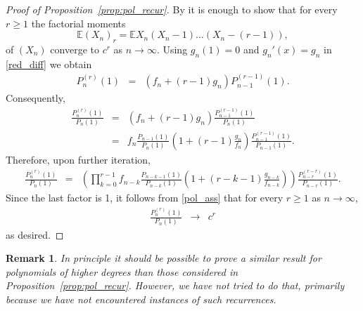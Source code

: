 \documentclass[10pt]{amsart}
\newtheorem{remark}{Remark}
\numberwithin{subcase}{case}
\begin{document}
\begin{proof}[Proof of Proposition~\ref{prop:pol_recur}]
By \cite[Theorem~20, Chapter~1]{B} it is enough to  show that for every $r\ge 1$  the factorial moments 
\[{\mathbb{E}}(X_n)_r={\mathbb{E}} X_n(X_n-1)\dots(X_n-(r-1)),\]
of $(X_n)$ converge to $c^r$ as $n\to\infty$.       
Using $g_n(1)=0$ and $g_n'(x)=g_n$ in \eqref{red_diff} we obtain 
\begin{eqnarray*}
P_n^{(r)}(1)&=&\left(f_n+(r-1)g_n\right)P_{n-1}^{(r-1)}(1).
\end{eqnarray*}
Consequently, 
\begin{eqnarray*}
\frac{P_n^{(r)}(1)}{P_n(1)}&=&(f_n+(r-1)g_n)\frac{P_{n-1}^{(r-1)}(1)}{P_{n}(1)}\\
&=&f_n\frac{P_{n-1}(1)}{P_{n}(1)}\left(1+(r-1)\frac{g_n}{f_n}\right)
\frac{P_{n-1}^{(r-1)}(1)}{P_{n-1}(1)}.
\end{eqnarray*}
Therefore, upon further iteration,
\begin{eqnarray*}
\frac{P_n^{(r)}(1)}{P_n(1)}&=&\left(\prod_{k=0}^{r-1}f_{n-k}{\frac{P_{n-k-1}(1)}{P_{n-k}(1)}\left(1+(r-k-1)\frac{g_{n-k}}{f_{n-k}}\right)}\right)\frac{P_{n-r}^{(r-r)}(1)}{P_{n-r}(1)}.
\end{eqnarray*}
Since the last factor is 1, it follows from \eqref{pol_ass} that for every $r\ge 1$ as 
 $n\rightarrow \infty$,
\begin{eqnarray*}
\frac{P_n^{(r)}(1)}{P_n(1)}&\rightarrow&c^r
\end{eqnarray*}
as desired.
\end{proof}

\begin{remark} In principle it should  be possible to prove a similar result  for polynomials of higher degrees than those considered in Proposition~\ref{prop:pol_recur}. However, we have not tried to do that, primarily because we have not encountered instances of such recurrences.
\end{remark}
\end{document}
